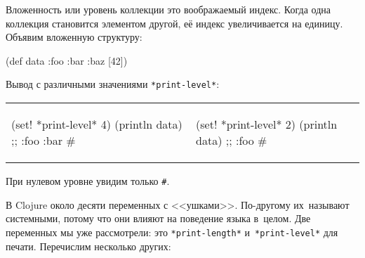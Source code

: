 Вложенность или уровень коллекции это воображаемый индекс. Когда одна коллекция
становится элементом другой, её индекс увеличивается на единицу. Объявим
вложенную структуру:

\begin{english}
  \begin{clojure}
(def data {:foo {:bar {:baz [42]}}})
  \end{clojure}
\end{english}

\noindent
Вывод с различными значениями \verb|*print-level*|:

\noindent
\begin{tabular}{ @{}p{5cm} @{}p{5cm} }

\begin{english}
  \begin{clojure}
(set! *print-level* 4)
(println data)
;; {:foo {:bar #}}
  \end{clojure}
\end{english}

&

\begin{english}
  \begin{clojure}
(set! *print-level* 2)
(println data)
;; {:foo #}
  \end{clojure}
\end{english}

\end{tabular}

\noindent
При нулевом уровне увидим только \verb|#|.


В Clojure около десяти переменных с <<ушками>>. По-другому их~называют
системными, потому что они влияют на поведение языка в~целом. Две переменных мы
уже рассмотрели: это \verb|*print-length*| и~\verb|*print-level*| для
печати. Перечислим несколько других:

